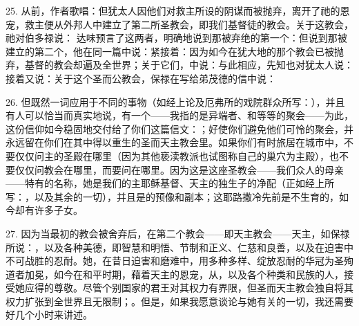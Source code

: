 25. 从前，作者歌唱：但犹太人因他们对救主所设的阴谋而被抛弃，离开了祂的恩宠，救主便从外邦人中建立了第二所圣教会，即我们基督徒的教会。关于这教会，祂对伯多禄说： 达味预言了这两者，明确地说到那被弃绝的第一个：但说到那被建立的第二个，他在同一篇中说：紧接着：因为如今在犹大地的那个教会已被抛弃，基督的教会却遍及全世界；关于它们，中说：与此相应，先知也对犹太人说： 接着又说：关于这个圣而公教会，保禄在写给弟茂德的信中说： \par

26. 但既然一词应用于不同的事物（如经上论及厄弗所的戏院群众所写：），并且有人可以恰当而真实地说，有一个——我指的是异端者、和等等的聚会——为此，这份信仰如今稳固地交付给了你们这篇信文：；好使你们避免他们可怜的聚会，并永远留在你们在其中得以重生的圣而天主教会里。如果你们有时旅居在城市中，不要仅仅问主的圣殿在哪里（因为其他亵渎教派也试图称自己的巢穴为主殿），也不要仅仅问教会在哪里，而要问在哪里。因为这是这座圣教会——我们众人的母亲——特有的名称，她是我们的主耶稣基督、天主的独生子的净配（正如经上所写：，以及其余的一切），并且是的预像和副本；这耶路撒冷先前是不生育的，如今却有许多子女。\par

27. 因为当最初的教会被舍弃后，在第二个教会——即天主教会——天主，如保禄所说：，以及各种美德，即智慧和明悟、节制和正义、仁慈和良善，以及在迫害中不可战胜的忍耐。她，在昔日迫害和磨难中，用多种多样、绽放忍耐的华冠为圣殉道者加冕，如今在和平时期，藉着天主的恩宠，从，以及各个种类和民族的人，接受她应得的尊敬。尽管个别国家的君王对其权力有界限，但圣而天主教会独自将其权力扩张到全世界且无限制；。但是，如果我愿意谈论与她有关的一切，我还需要好几个小时来讲述。\par

